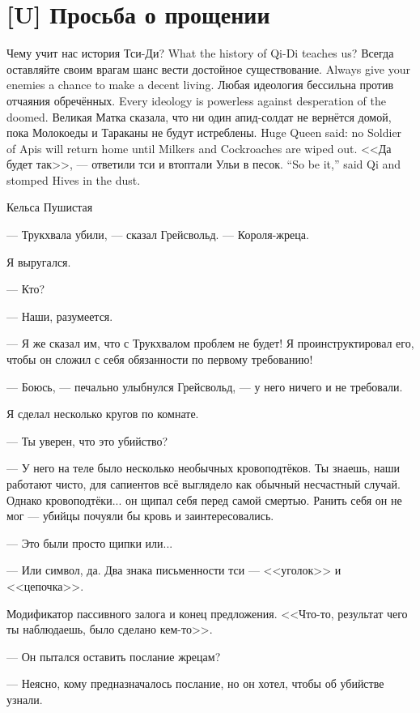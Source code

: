 \section{[U] Просьба о прощении}

\epigraph
{
{Чему учит нас история Тси-Ди?}
{What the history of Qi-Di teaches us?}
{Всегда оставляйте своим врагам шанс вести достойное существование.}
{Always give your enemies a chance to make a decent living.}
{Любая идеология бессильна против отчаяния обречённых.}
{Every ideology is powerless against desperation of the doomed.}
{Великая Матка сказала, что ни один апид-солдат не вернётся домой, пока Молокоеды и Тараканы не будут истреблены.}
{Huge Queen said: no Soldier of Apis will return home until Milkers and Cockroaches are wiped out.}
{<<Да будет так>>, --- ответили тси и втоптали Ульи в песок.}
{``So be it,'' said Qi and stomped Hives in the dust.}
}{Кельса Пушистая}

\textspace

--- Трукхвала убили, --- сказал Грейсвольд.
--- Короля-жреца.

Я выругался.

--- Кто?

--- Наши, разумеется.

--- Я же сказал им, что с Трукхвалом проблем не будет!
Я проинструктировал его, чтобы он сложил с себя обязанности по первому требованию!

--- Боюсь, --- печально улыбнулся Грейсвольд, --- у него ничего и не требовали.

Я сделал несколько кругов по комнате.

--- Ты уверен, что это убийство?

--- У него на теле было несколько необычных кровоподтёков.
Ты знаешь, наши работают чисто, для сапиентов всё выглядело как обычный несчастный случай.
Однако кровоподтёки... он щипал себя перед самой смертью.
Ранить себя он не мог --- убийцы почуяли бы кровь и заинтересовались.

--- Это были просто щипки или...

--- Или символ, да.
Два знака письменности тси --- <<уголок>> и <<цепочка>>.

Модификатор пассивного залога и конец предложения.
<<Что-то, результат чего ты наблюдаешь, было сделано кем-то>>.

--- Он пытался оставить послание жрецам?

--- Неясно, кому предназначалось послание, но он хотел, чтобы об убийстве узнали.

